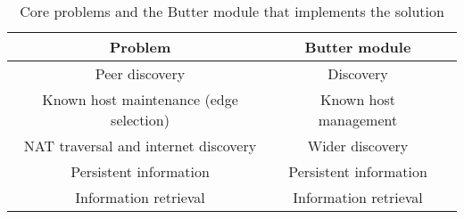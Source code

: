 \begin{table}[h]
    \centering
    \begin{tabular}{|c|c|c|}
        \hline
        \textbf{Problem}                        & \textbf{Butter module} \\
        \hline
        Peer discovery                          & Discovery              \\
        Known host maintenance (edge selection) & Known host management  \\
        NAT traversal and internet discovery    & Wider discovery        \\
        Persistent information                  & Persistent information \\
        Information retrieval                   & Information retrieval  \\
        \hline
    \end{tabular}
    \caption{Core problems and the Butter module that implements the solution}
    \label{tab:prob_module}
\end{table}